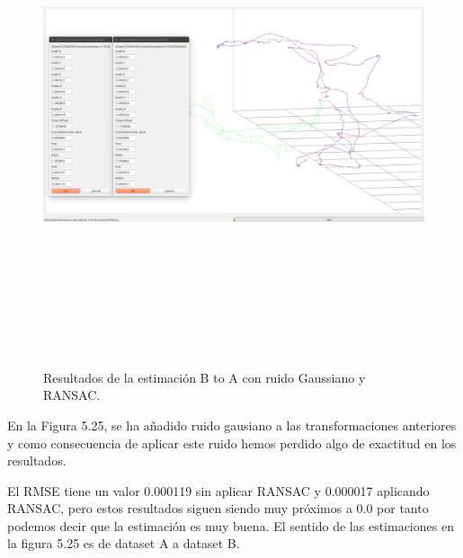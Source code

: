 \begin{figure}[H]
\begin{center}
\label{fig:opciones de View}\includegraphics[height=14.0cm,width=18.0cm]{img/cap6/newData_EscalaTraslaRotaGauss_ab.png}
\hspace{0.5cm}

\end{center}


\caption{Resultados de la estimación B to A con ruido Gaussiano y  RANSAC.}
\end{figure}

En la Figura 5.25, se ha añadido ruido gausiano a las transformaciones anteriores y como consecuencia de aplicar este ruido hemos perdido algo de exactitud en los resultados.

El RMSE tiene un valor 0.000119 sin aplicar RANSAC y 0.000017 aplicando RANSAC, pero estos resultados siguen siendo muy próximos a 0.0 por tanto podemos decir que la estimación es muy buena.
El sentido de las estimaciones en la figura 5.25 es de dataset A a dataset B.


